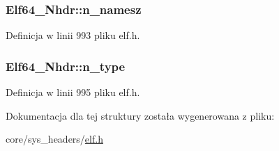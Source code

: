 \hypertarget{struct_elf64___nhdr_a1169a3f8272ba5265ea3aecdc4974546}{
\subsubsection[{n\-\_\-namesz}]{ Elf64\-\_\-\-Nhdr\-::n\-\_\-namesz}}\label{struct_elf64___nhdr_a1169a3f8272ba5265ea3aecdc4974546}


Definicja w linii 993 pliku elf.\-h.

\hypertarget{struct_elf64___nhdr_abbb820712cc219d235bb7eb3c11eefbe}{
\subsubsection[{n\-\_\-type}]{ Elf64\-\_\-\-Nhdr\-::n\-\_\-type}}\label{struct_elf64___nhdr_abbb820712cc219d235bb7eb3c11eefbe}


Definicja w linii 995 pliku elf.\-h.



Dokumentacja dla tej struktury została wygenerowana z pliku\-:\begin{DoxyCompactItemize}
\item 
core/sys\-\_\-headers/\hyperlink{elf_8h}{elf.\-h}\end{DoxyCompactItemize}
